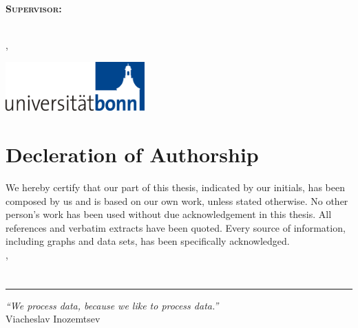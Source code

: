 \begin{titlepage}
	\centering
	
	\Large\scshape
	\infoInstitute\\
	\infoDepartment
	\vspace{0.17\textheight}\\
	
	\Huge\normalfont
	\infoTitleHead
	\vspace{0.3\baselineskip}\\
	\huge\bfseries
	\infoTitle
	\vspace{0.12\textheight}\\
	
	\Large
	\infoThesisType\\[0.3\baselineskip]
	\normalfont\large
	Supervisor:	\infoAdvisor
	\vspace{4\baselineskip}\\
	
	\Large
	\infoAuthorP
	
	\infoAuthorI
	\vspace{4\baselineskip}\\
	\infoLocation, \infoDate
	\vfill
	
	\includegraphics[width=0.4\textwidth]{images/uni_bonn_logo}
	
\end{titlepage}
\restoregeometry


\chapter*{Decleration of Authorship}

We hereby certify that our part of this thesis, indicated by our initials, has been composed by us and is based on our own work, unless stated otherwise.
No other person's work has been used without due acknowledgement in this thesis.
All references and verbatim extracts have been quoted.
Every source of information, including graphs and data sets, has been specifically acknowledged.
\vspace{4\baselineskip}\\
\infoLocation, \infoDate \hfill \infoAuthor
\vspace{4\baselineskip}\\

\chapter*{}
\vfill
\rule{\textwidth}{0.4pt}
\emph{``We process data, because we like to process data.''}\\ Viacheslav Inozemtsev